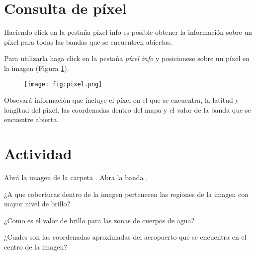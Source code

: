 \section{Consulta de píxel}

Haciendo click en la pestaña píxel info es posible obtener la información sobre un píxel para todas las bandas que se encuentren abiertas.

Para utilizarla haga click en la pestaña \emph{píxel info} y posicionese sobre un píxel en la imagen (Figura \ref{fig:pixel}).

\begin{figure}[h!]
    \centering
    \texttt{[image: fig:pixel.png]}
    \caption{}
    \label{fig:pixel}
\end{figure}

Obsevará información que incluye el píxel en el que se encuentra, la latitud y longitud del píxel, las coordenadas dentro del mapa y el valor de la banda que se encuentre abierta.

\section{Actividad}

Abrá la imagen  de la  carpeta . Abra la banda .

\begin{que}
    ¿A que coberturas dentro de la imagen pertenecen las regiones de la imagen con mayor nivel de brillo?
\end{que}

\begin{que}
    ¿Como es el valor de brillo para las zonas de cuerpos de agua?
\end{que}

\begin{que}
    ¿Cuales son las coordenadas aproximadas del aeropuerto que se encuentra en el centro de la imagen?
\end{que}
